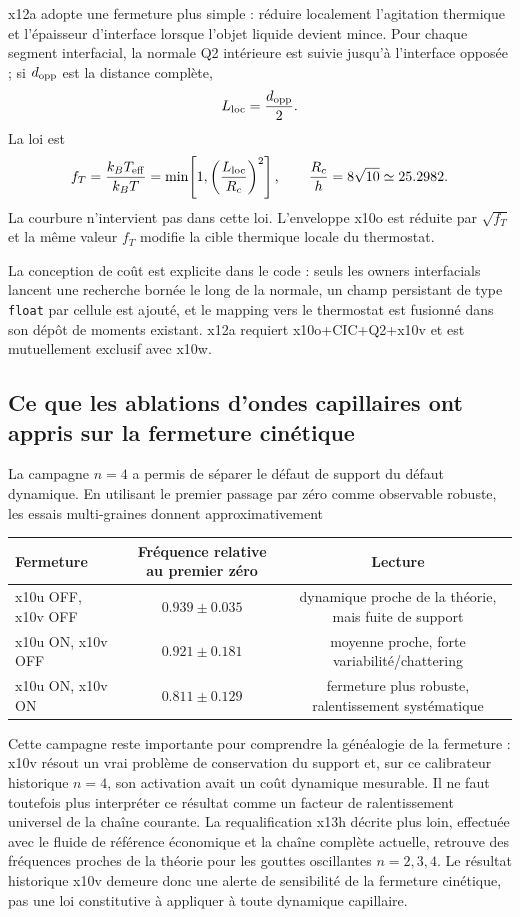 \documentclass[11pt,a4paper]{article}
\begin{document}
x12a adopte une fermeture plus simple : réduire localement l'agitation thermique et l'épaisseur d'interface lorsque l'objet liquide devient mince. Pour chaque segment interfacial, la normale Q2 intérieure est suivie jusqu'à l'interface opposée ; si $d_{\rm opp}$ est la distance complète,
\begin{equation}
  L_{\rm loc}=\frac{d_{\rm opp}}{2}.
\end{equation}
La loi est
\begin{equation}
  f_T
  =
  \frac{k_BT_{\rm eff}}{k_BT}
  =
  \min\!\left[
      1,
      \left(\frac{L_{\rm loc}}{R_c}\right)^2
  \right],
  \qquad
  \frac{R_c}{h}=8\sqrt{10}
  \simeq25.2982.
  \label{eq:x12a_local_cooling}
\end{equation}
La courbure n'intervient pas dans cette loi. L'enveloppe x10o est réduite par $\sqrt{f_T}$ et la même valeur $f_T$ modifie la cible thermique locale du thermostat.

La conception de coût est explicite dans le code : seuls les owners interfacials lancent une recherche bornée le long de la normale, un champ persistant de type \texttt{float} par cellule est ajouté, et le mapping vers le thermostat est fusionné dans son dépôt de moments existant. x12a requiert x10o+CIC+Q2+x10v et est mutuellement exclusif avec x10w.

\subsection{Ce que les ablations d'ondes capillaires ont appris sur la fermeture cinétique}

La campagne $n=4$ a permis de séparer le défaut de support du défaut dynamique. En utilisant le premier passage par zéro comme observable robuste, les essais multi-graines donnent approximativement
\begin{center}
\begin{tabular}{lcc}
\toprule
Fermeture & Fréquence relative au premier zéro & Lecture \\
\midrule
x10u OFF, x10v OFF & $0.939\pm0.035$ & dynamique proche de la théorie, mais fuite de support \\
x10u ON, x10v OFF & $0.921\pm0.181$ & moyenne proche, forte variabilité/chattering \\
x10u ON, x10v ON & $0.811\pm0.129$ & fermeture plus robuste, ralentissement systématique \\
\bottomrule
\end{tabular}
\end{center}
Cette campagne reste importante pour comprendre la généalogie de la fermeture : x10v résout un vrai problème de conservation du support et, sur ce calibrateur historique $n=4$, son activation avait un coût dynamique mesurable. Il ne faut toutefois plus interpréter ce résultat comme un facteur de ralentissement universel de la chaîne courante. La requalification x13h décrite plus loin, effectuée avec le fluide de référence économique et la chaîne complète actuelle, retrouve des fréquences proches de la théorie pour les gouttes oscillantes $n=2,3,4$. Le résultat historique x10v demeure donc une alerte de sensibilité de la fermeture cinétique, pas une loi constitutive à appliquer à toute dynamique capillaire.
\end{document}
